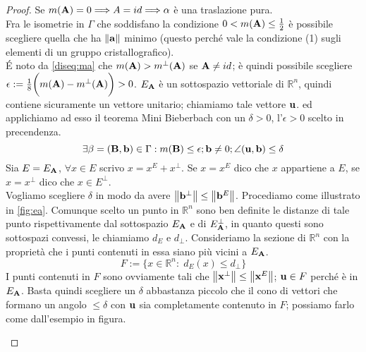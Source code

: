 \documentclass[a4paper,11pt,openright,twoside	]{book}
\begin{document}
\begin{proof}
Se $m(\vb{A}) = 0 \Longrightarrow A = id \Longrightarrow \alpha$ è una traslazione pura. \\
Fra le isometrie in $\Gamma$ che soddisfano la condizione  $ 0 < m(\vb{A}) \leq \frac{1}{2}$ è possibile scegliere quella che ha $\norm{\vb{a}}$ minimo (questo perché vale la condizione (1) sugli elementi di un gruppo cristallografico). \\
\'E noto da \ref{diseq:ma} che $m(\vb{A}) > m^{\perp}(\vb{A})$ se  $\vb{A} \neq id$; è quindi possibile scegliere  $\epsilon := \frac{1}{8} \bigg( m(\vb{A}) - m^{\perp}(\vb{A}) \bigg) >0$.
$E_{\vb{A}}$ è un sottospazio vettoriale di $\mathbb{R}^n$, quindi contiene sicuramente un vettore unitario; chiamiamo tale vettore $\vb{u}$.  ed applichiamo ad esso il teorema Mini Bieberbach con un $\delta >0$, l'$\epsilon >0 $ scelto in precendenza. \\
\[ \exists \beta = (\vb{B, b}) \in \Gamma : m(\vb{B}) \leq \epsilon ; \vb{b} \neq 0 ; \angle(\vb{u, b})  \leq \delta \]
Sia $E = E_{\vb{A}}$, $\forall x \in E$ scrivo $x = x^{E} + x^{\perp}$. Se $x = x^{E}$ dico che $x$ appartiene a $E$, se $x = x^{\perp}$ dico che $x \in E^{\perp}$.  \\
Vogliamo scegliere $\delta$ in modo da avere $\norm{\vb{b}^{\perp}} \leq \norm{\vb{b}^E}$. 
Procediamo come illustrato in \ref{fig:ea}. 
Comunque scelto un punto in $\mathbb{R}^n$ sono ben definite le distanze di tale punto rispettivamente dal sottospazio $E_{\vb{A}}$ e di $E_{\vb{A}}^{\perp}$, in quanto questi sono sottospazi convessi, le chiamiamo $d_E$ e $d_{\perp}$. Consideriamo la sezione di $\mathbb{R}^n$ con la proprietà che i punti contenuti in essa siano più vicini a $E_{\vb{A}}$.
\[ F := \{ x \in \mathbb{R}^n : \; d_E(x) \leq d_{\perp}  \} \]
I punti contenuti in $F$ sono ovviamente tali che $\norm{\vb{x}^{\perp}} \leq \norm{\vb{x}^E}$; $\vb{u} \in F$  perché è in $E_{\vb{A}}$. 
Basta quindi scegliere un $\delta$ abbastanza piccolo che il cono di vettori che formano un angolo $\leq \delta$ con $\vb{u} $ sia completamente contenuto in $F$; possiamo farlo come dall'esempio in figura. \\
\begin{figure}[h!]
\centering
{}
\end{figure}
\end{proof}
\end{document}
